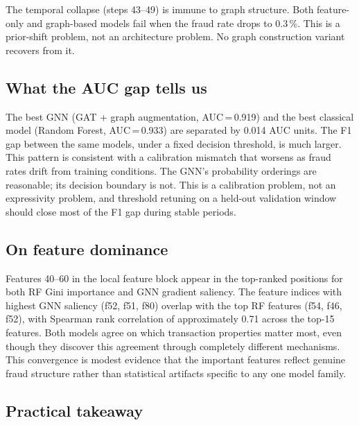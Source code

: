 The temporal collapse (steps 43--49) is immune to graph structure. Both
feature-only and graph-based models fail when the fraud rate drops to 0.3\,\%.
This is a prior-shift problem, not an architecture problem. No graph
construction variant recovers from it.

\subsection{What the AUC gap tells us}

The best GNN (GAT + graph augmentation, AUC\,=\,0.919) and the best classical
model (Random Forest, AUC\,=\,0.933) are separated by 0.014 AUC units.
The F1 gap between the same models, under a fixed decision threshold, is
much larger. This pattern is consistent with a calibration mismatch that
worsens as fraud rates drift from training conditions. The GNN's probability
orderings are reasonable; its decision boundary is not.
This is a calibration problem, not an expressivity problem, and threshold
retuning on a held-out validation window should close most of the F1 gap
during stable periods.

\subsection{On feature dominance}

Features 40--60 in the local feature block appear in the top-ranked
positions for both RF Gini importance and GNN gradient saliency. The
feature indices with highest GNN saliency (f52, f51, f80) overlap with
the top RF features (f54, f46, f52), with Spearman rank correlation of
approximately 0.71 across the top-15 features. Both models agree on which
transaction properties matter most, even though they discover this agreement
through completely different mechanisms. This convergence is modest evidence
that the important features reflect genuine fraud structure rather than
statistical artifacts specific to any one model family.

\subsection{Practical takeaway}

